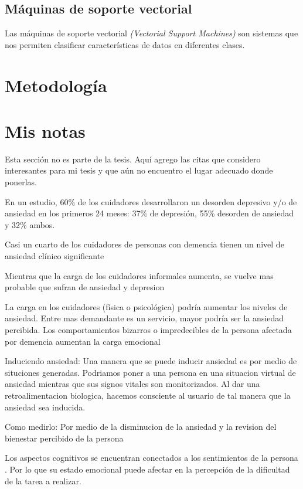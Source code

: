 \documentclass[letterpaper,12pt]{cicese}
\begin{document}
		\section{M\'aquinas de soporte vectorial}
			Las m\'aquinas de soporte vectorial \textit{(Vectorial Support Machines)} son sistemas que nos permiten clasificar caracter\'isticas de datos en diferentes clases.
		
	\newpage
		\chapter{Metodolog\'ia}
			
	\newpage
		\chapter{Mis notas}
			Esta secci\'on no es parte de la tesis. Aqu\'i agrego las citas que considero interesantes para mi tesis y que a\'un no encuentro el lugar adecuado donde ponerlas.

	
	
		En un estudio, 60\% de los cuidadores desarrollaron un desorden depresivo y/o de ansiedad en los primeros 24 meses: 37\% de depresi\'on, 55\% desorden de ansiedad y 32\% ambos. \citep{Joling2014}

		Casi un cuarto de los cuidadores de personas con demencia tienen un nivel de ansiedad cl\'inico significante \citep{Cooper200615}

		Mientras que la carga de los cuidadores informales aumenta, se vuelve mas probable que sufran de ansiedad y depresion \citep{Denno20131731}

		La carga en los cuidadores (f\'isica o psicol\'ogica) podr\'ia aumentar los niveles de ansiedad. Entre mas demandante es un servicio, mayor podr\'ia ser la ansiedad percibida. Los comportamientos bizarros o impredecibles de la persona afectada por demencia aumentan la carga emocional \citep{Rosa201054}

		Induciendo ansiedad: Una manera que se puede inducir ansiedad es por medio de situciones generadas. Podriamos poner a una persona en una situacion virtual de ansiedad mientras que sus signos
		vitales son monitorizados. Al dar una retroalimentacion biologica, hacemos consciente al usuario de tal manera que la ansiedad sea inducida.

		Como medirlo: Por medio de la disminucion de la ansiedad y la revision del bienestar percibido de la persona
		
		Los aspectos cognitivos se encuentran conectados a los sentimientos de la persona \citep{Wilt2011987}. Por lo que su estado emocional puede afectar en la percepci\'on de la dificultad de la tarea a realizar.
\end{document}
